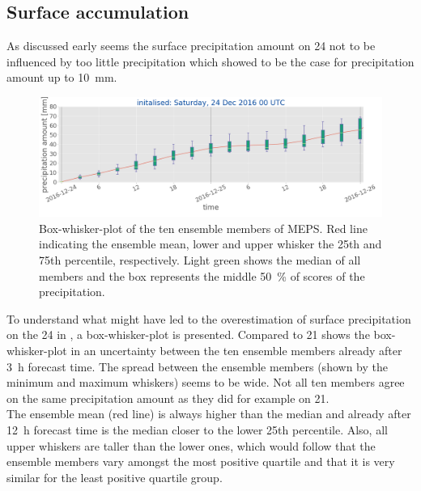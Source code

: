 \subsection{Surface accumulation}\label{sec:2412:surface}
As discussed early seems the surface precipitation amount on \SI{24}{\dec} not to be influenced by too little precipitation which \cite{muller_arome-metcoop:_2017} showed to be the case for precipitation amount up to \SI{10}{\mm}. 
\begin{figure}[t]
	\includegraphics[width=\textwidth]{./fig_boxplot_sfc/20161224_0}
	\caption{Box-whisker-plot of the ten ensemble members of MEPS. Red line indicating the ensemble mean, lower and upper whisker the 25th and 75th percentile, respectively. Light green shows the median of all members and the box represents the middle \SI{50}{\percent} of scores of the precipitation.}\label{fig:boxplt24}
\end{figure}
To understand what might have led to the overestimation of surface precipitation on the \SI{24}{\dec} in , a box-whisker-plot is presented. Compared to \SI{21}{\dec} shows the box-whisker-plot in  an uncertainty between the ten ensemble members already after \SI{3}{\hour} forecast time. The spread between the ensemble members (shown by the minimum and maximum whiskers) seems to be wide. Not all ten members agree on the same precipitation amount as they did for example on \SI{21}{\dec}.
\\
The ensemble mean (red line) is always higher than the median and already after \SI{12}{\hour} forecast time is the median closer to the lower 25th percentile. Also, all upper whiskers are taller than the lower ones, which would follow that the ensemble members vary amongst the most positive quartile and that it is very similar for the least positive quartile group.
